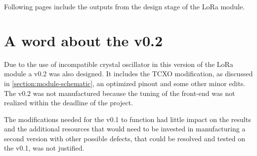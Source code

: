 
Following pages include the outputs from the design stage of the LoRa module.

\section{A word about the v0.2}

Due to the use of incompatible crystal oscillator in this version of the LoRa module a v0.2 was also designed. It includes the TCXO modification, as discussed in \ref{section:module-schematic}, an optimized pinout and some other minor edits. The v0.2 was not manufactured because the tuning of the front-end was not realized within the deadline of the project. 

The modifications needed for the v0.1 to function had little impact on the results and the additional resources that would need to be invested in manufacturing a second version with other possible defects, that could be resolved and tested on the v0.1, was not justified.

